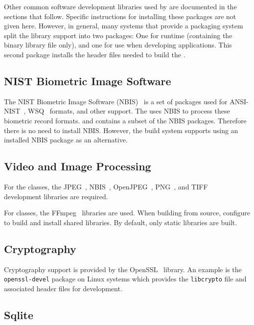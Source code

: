 Other common software development libraries used by \sname are documented in
the sections that follow. Specific instructions for installing these packages
are not given here. However, in general, many systems that provide a packaging
system split the library support into two packages: One for runtime (containing
the binary library file only), and one for use when developing applications.
This second package installs the header files needed to build the \sname.

\subsection{NIST Biometric Image Software}

The NIST Biometric Image Software (NBIS)~\cite{nist:nbis} is a set of packages
used for ANSI-NIST~\cite{std:an2k}, WSQ~\cite{std:wsq} formats, and other
support.  The \sname uses NBIS to process these biometric record formats.
and contains a subset of the NBIS packages. Therefore there is no need to
install NBIS.  However, the \sname build system supports using an installed
NBIS package as an alternative.

\subsection{Video and Image Processing}

For the  classes, the JPEG~\cite{libjpeg},
NBIS~\cite{nist:nbis}, OpenJPEG~\cite{libopenjpeg}, PNG~\cite{libpng}, and
TIFF~\cite{libtiff} development libraries are required.

For  classes, the FFmpeg~\cite{libffmpeg} libraries are used.
When building from source, configure to build and
install shared libraries. By default, only static libraries are built.

\subsection{Cryptography}

Cryptography support is provided by the OpenSSL~\cite{openssl} library.
An example is the \texttt{openssl-devel} package on Linux systems which
provides the \texttt{libcrypto} file and associated header files for
development.

\subsection{Sqlite}

